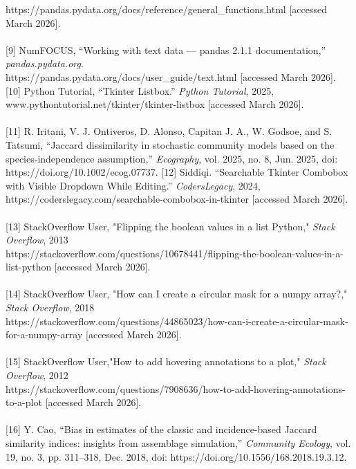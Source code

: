\documentclass{article}
\begin{document}
https://pandas.pydata.org/docs/reference/general\_functions.html [accessed March 2026]. \\\\
‌[9] NumFOCUS, “Working with text data — pandas 2.1.1 documentation,” \textit{pandas.pydata.org}. \\ https://pandas.pydata.org/docs/user\_guide/text.html [accessed March 2026].
‌[10] Python Tutorial, “Tkinter Listbox.” \textit{Python Tutorial}, 2025, www.pythontutorial.net/tkinter/tkinter-listbox [accessed March 2026]. \\ \\
‌[11] R. Iritani, V. J. Ontiveros, D. Alonso, Capitan J. A., W. Godsoe, and S. Tatsumi, “Jaccard dissimilarity in stochastic community models based on the species‐independence assumption,” \textit{Ecography}, vol. 2025, no. 8, Jun. 2025, doi: https://doi.org/10.1002/ecog.07737.
‌‌[12] Siddiqi. “Searchable Tkinter Combobox with Visible Dropdown While Editing.” \textit{CodersLegacy}, 2024, https://coderslegacy.com/searchable-combobox-in-tkinter [accessed March 2026]. \\ \\
‌[13] StackOverflow User, "Flipping the boolean values in a list Python," \textit{Stack Overflow}, 2013 \\ 
‌https://stackoverflow.com/questions/10678441/flipping-the-boolean-values-in-a-list-python [accessed March 2026]. \\ \\
‌[14] StackOverflow User, "How can I create a circular mask for a numpy array?," \textit{Stack Overflow}, 2018 \\ 
‌https://stackoverflow.com/questions/44865023/how-can-i-create-a-circular-mask-for-a-numpy-array [accessed March 2026]. \\ \\
‌[15] StackOverflow User,"How to add hovering annotations to a plot," \textit{Stack Overflow}, 2012 \\ 
‌https://stackoverflow.com/questions/7908636/how-to-add-hovering-annotations-to-a-plot [accessed March 2026]. \\ \\
‌[16] Y. Cao, “Bias in estimates of the classic and incidence-based Jaccard similarity indices: insights from assemblage simulation,” \textit{Community Ecology}, vol. 19, no. 3, pp. 311–318, Dec. 2018, doi: https://doi.org/10.1556/168.2018.19.3.12.
‌
\end{document}
